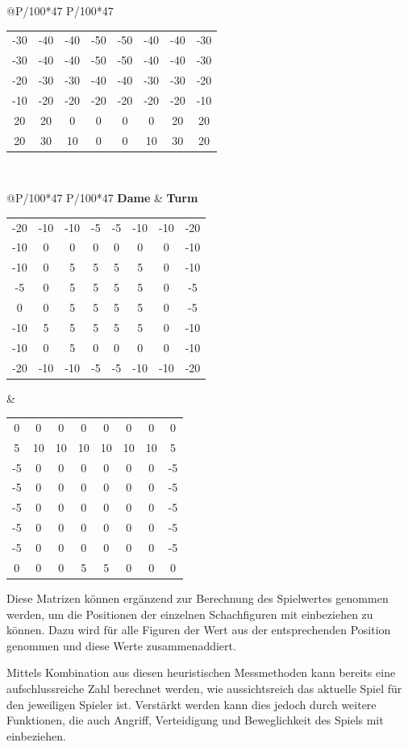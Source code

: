 \begin{table}[htbp]
\begin{tabular}{@{}P{\textwidth/100*47} P{\textwidth/100*47}}
\begin{tabular}{c c c c c c c c}
-30&-40&-40&-50&-50&-40&-40&-30\\
-30&-40&-40&-50&-50&-40&-40&-30\\
-20&-30&-30&-40&-40&-30&-30&-20\\
-10&-20&-20&-20&-20&-20&-20&-10\\
20&20&0&0&0&0&20&20\\
20&30&10&0&0&10&30&20
\end{tabular}
\end{tabular}\\
\begin{tabular}{@{}P{\textwidth/100*47} P{\textwidth/100*47}}
\textbf{Dame} & \textbf{Turm}\\
\begin{tabular}{@{}c c c c c c c c}
-20&-10&-10&-5&-5&-10&-10&-20\\
-10&0&0&0&0&0&0&-10\\
-10&0&5&5&5&5&0&-10\\
-5&0&5&5&5&5&0&-5\\
0&0&5&5&5&5&0&-5\\
-10&5&5&5&5&5&0&-10\\
-10&0&5&0&0&0&0&-10\\
-20&-10&-10&-5&-5&-10&-10&-20
\end{tabular}
&
\begin{tabular}{c c c c c c c c}
0&0&0&0&0&0&0&0\\
5&10&10&10&10&10&10&5\\
-5&0&0&0&0&0&0&-5\\
-5&0&0&0&0&0&0&-5\\
-5&0&0&0&0&0&0&-5\\
-5&0&0&0&0&0&0&-5\\
-5&0&0&0&0&0&0&-5\\
0&0&0&5&5&0&0&0
\end{tabular}
\end{tabular}
\end{table}

Diese Matrizen können ergänzend zur Berechnung des Spielwertes genommen werden, um die Positionen der einzelnen Schachfiguren mit einbeziehen zu können. Dazu wird für alle Figuren der Wert aus der entsprechenden Position genommen und diese Werte zusammenaddiert.

Mittels Kombination aus diesen heuristischen Messmethoden kann bereits eine aufschlussreiche Zahl berechnet werden, wie aussichtsreich das aktuelle Spiel für den jeweiligen Spieler ist. Verstärkt werden kann dies jedoch durch weitere Funktionen, die auch Angriff, Verteidigung und Beweglichkeit des Spiels mit einbeziehen.

